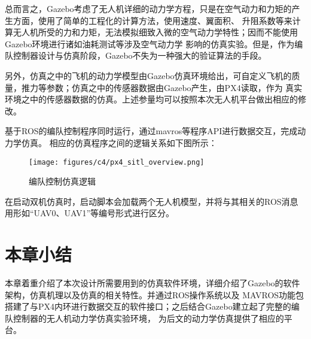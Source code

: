 总而言之，Gazebo考虑了无人机详细的动力学方程，只是在空气动力和力矩的产生方面，使用了简单的工程化的计算方法，使用速度、翼面积、
升阻系数等来计算无人机所受的力和力矩，无法模拟细致入微的空气动力学特性；因而不能使用Gazebo环境进行诸如油耗测试等涉及空气动力学
影响的仿真实验。但是，作为编队控制器设计与仿真阶段，Gazebo不失为一种强大的验证算法的手段。

另外，仿真之中的飞机的动力学模型由Gazebo仿真环境给出，可自定义飞机的质量，推力等参数；仿真之中的传感器数据由Gazebo产生，由PX4读取，作为
真实环境之中的传感器数据的仿真。上述参量均可以按照本次无人机平台做出相应的修改。

基于ROS的编队控制程序同时运行，通过mavros等程序API进行数据交互，完成动力学仿真。
相应的仿真程序之间的逻辑关系如下图所示：
\begin{figure}[H]
    \centering
    \texttt{[image: figures/c4/px4\_sitl\_overview.png]}
    \caption{编队控制仿真逻辑}\label{fig:px4_sitl_overview}
\end{figure}
在启动双机仿真时，启动脚本会加载两个无人机模型，并将与其相关的ROS消息用形如“UAV0、UAV1”等编号形式进行区分。
\section{本章小结}
本章着重介绍了本次设计所需要用到的仿真软件环境，详细介绍了Gazebo的软件架构，仿真机理以及仿真的相关特性。并通过ROS操作系统以及
MAVROS功能包搭建了与PX4内环进行数据交互的软件接口；之后结合Gazebo建立起了完整的编队控制器的无人机动力学仿真实验环境，
为后文的动力学仿真提供了相应的平台。
